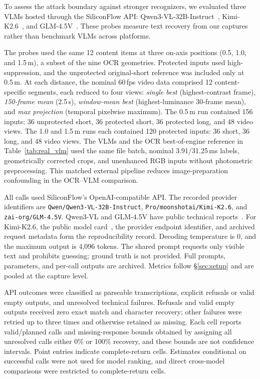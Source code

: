\documentclass{ieeeaccess}
\begin{document}
To assess the attack boundary against stronger recognizers, we evaluated three VLMs hosted through the SiliconFlow API: Qwen3-VL-32B-Instruct~\cite{b_qwen3vl2025}, Kimi-K2.6~\cite{b_kimi_k26}, and GLM-4.5V~\cite{b_glm45v2025}. These probes measure text recovery from our captures rather than benchmark VLMs across platforms.

The probes used the same 12 content items at three on-axis positions (0.5, 1.0, and 1.5\,m), a subset of the nine OCR geometries. Protected inputs used high-suppression, and the unprotected original-short reference was included only at 0.5\,m. At each distance, the nominal 60\,fps video data comprised 12 content-specific segments, each reduced to four views: \emph{single best} (highest-contrast frame), \emph{150-frame mean} (2.5\,s), \emph{window-mean best} (highest-luminance 30-frame mean), and \emph{max projection} (temporal pixelwise maximum). The 0.5\,m run contained 156 inputs: 36 unprotected short, 36 protected short, 36 protected long, and 48 video views. The 1.0 and 1.5\,m runs each contained 120 protected inputs: 36 short, 36 long, and 48 video views. The VLMs and the OCR best-of-engine reference in Table~\ref{tab:real_vlm} used the same file batch, nominal 3.91/31.25\,ms labels, geometrically corrected crops, and unenhanced RGB inputs without photometric preprocessing. This matched external pipeline reduces image-preparation confounding in the OCR--VLM comparison.

All calls used SiliconFlow's OpenAI-compatible API. The recorded provider identifiers are \texttt{Qwen/\allowbreak Qwen3-\allowbreak VL-\allowbreak 32B-\allowbreak Instruct}, \texttt{Pro/\allowbreak moonshotai/\allowbreak Kimi-\allowbreak K2.6}, and \texttt{zai-\allowbreak org/\allowbreak GLM-\allowbreak 4.5V}. Qwen3-VL and GLM-4.5V have public technical reports~\cite{b_qwen3vl2025,b_glm45v2025}. For Kimi-K2.6, the public model card~\cite{b_kimi_k26}, the provider endpoint identifier, and archived request metadata form the reproducibility record. Decoding temperature is 0, and the maximum output is 4,096 tokens. The shared prompt requests only visible text and prohibits guessing; ground truth is not provided. Full prompts, parameters, and per-call outputs are archived. Metrics follow \S\ref{sec:setup} and are pooled at the capture level.

API outcomes were classified as parseable transcriptions, explicit refusals or valid empty outputs, and unresolved technical failures. Refusals and valid empty outputs received zero exact match and character recovery; other failures were retried up to three times and otherwise retained as missing. Each cell reports valid/planned calls and missing-response bounds obtained by assigning all unresolved calls either 0\% or 100\% recovery, and these bounds are not confidence intervals. Point entries indicate complete-return cells. Estimates conditional on successful calls were not used for model ranking, and direct cross-model comparisons were restricted to complete-return cells.
\end{document}
